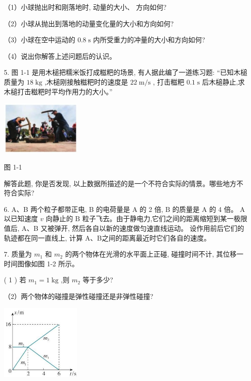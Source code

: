 \documentclass[10pt]{article}
\begin{document}
（1）小球抛出时和刚落地时, 动量的大小、 方向如何?

（2）小球从抛出到落地的动量变化量的大小和方向如何?

（3）小球在空中运动的 \({0.8}\mathrm{\;s}\) 内所受重力的冲量的大小和方向如何?

（4）说出你解答上述问题后的认识。

5. 图 1-1 是用木槌把糯米饭打成糍粑的场景, 有人据此编了一道练习题: “已知木槌质量为 \({18}\mathrm{\;{kg}}\) ,木槌刚接触糍粑时的速度是 \({22}\mathrm{\;m}/\mathrm{s}\) , 打击糍粑 \({0.1}\mathrm{\;s}\) 后木槌静止,求木槌打击糍粑时平均作用力的大小。”

\begin{center}
\includegraphics[max width=0.3\textwidth]{images/01910e4c-ebb8-7d2c-8f2f-2375bc1d2d12_34_337287.jpg}
\end{center}

图 1-1

解答此题, 你是否发现, 以上数据所描述的是一个不符合实际的情景。哪些地方不符合实际?

6. A、B 两个粒子都带正电, B 的电荷量是 \(\mathrm{A}\) 的 2 倍, \(\mathrm{B}\) 的质量是 \(\mathrm{A}\) 的 4 倍。 \(\mathrm{A}\) 以已知速度 \(v\) 向静止的 \(\mathrm{B}\) 粒子飞去。由于静电力,它们之间的距离缩短到某一极限值后, A、B 又被弹开, 然后各自以新的速度做匀速直线运动。 设作用前后它们的轨迹都在同一直线上, 计算 A、B之间的距离最近时它们各自的速度。

7. 质量为 \({m}_{1}\) 和 \({m}_{2}\) 的两个物体在光滑的水平面上正碰, 碰撞时间不计, 其位移一时间图像如图 1-2 所示。

( 1 ) 若 \({m}_{1} = 1\mathrm{\;{kg}}\) ,则 \({m}_{2}\) 等于多少?

（2）两个物体的碰撞是弹性碰撞还是非弹性碰撞?

\begin{center}
\includegraphics[max width=0.3\textwidth]{images/01910e4c-ebb8-7d2c-8f2f-2375bc1d2d12_34_210424.jpg}
\end{center}
\end{document}
